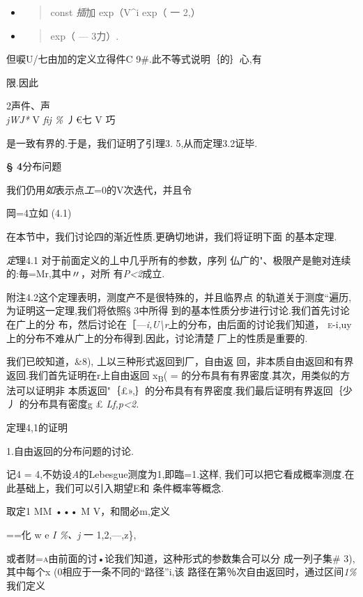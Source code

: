 \documentclass{article}
\begin{document}
\begin{itemize}
\item
  \begin{quote}
  const \emph{插}加 \textbar{}exp（V\^{}i exp（ 一 2,）
  \end{quote}
\item
  \begin{quote}
  exp（ --- 3力）.
  \end{quote}
\end{itemize}

但唳U/七由加的定义立得件C 9\#.此不等式说明｛的｝心,有

限.因此

2声件、声\\
\emph{jWJ*} V \emph{fij \%} 丿€七 V 巧

是一致有界的.于是，我们证明了引理3. 5,从而定理3.2证毕.\textbar{}

\protect\hypertarget{bookmark395}{}{}\textbf{§ 4}分布问题

我们仍用\emph{如}表示点\emph{工}=0的V次迭代，并且令

岡=4立如 (4.1)

在本节中，我们讨论四的渐近性质.更确切地讲，我们将证明下面 的基本定理.

\emph{定}理4.1 对于前面定义的丄中几乎所有的参数，序列
仏广的"、极限产是鲍对连续的:毎=Mr,其中〃，对所
有\emph{P\textless{}2}成立.

附注4.2这个定理表明，测度产不是很特殊的，并且临界点
的轨道关于测度``遍历,为证明这一定理,我们将依照§ 3中所得
到的基本性质分步进行讨论.我们首先讨论在广上的分
布，然后讨论在［---\emph{i,U\textbackslash{}r}上的分布，由后面的讨论我们知道，
\textsc{e-}i,uy 上的分布不难从广上的分布得到.因此，讨论清楚
厂上的性质是重要的.

我们已皎知道，\&8), 丄以三种形式返回到厂，自由返
回，非本质自由返回和有界返回.我们首先证明在r上自由返回
x\textsubscript{B}( = 的分布具有有界密度.其次，用类似的方法可以证明非
本质返回"｛£»,｝的分布具有有界密度.我们最后证明有界返回｛少丿
的分布具有密度g £ \emph{Lf,p\textless{}2.}

定理4,1的证明

1.自由返回的分布问题的讨论.

记4 = 4,不妨设\emph{A}的Lebesgue测度为1,即臨=1.这样,
我们可以把它看成概率测度.在此基础上，我们可以引入期望E和 条件概率等概念.

取定1 MM ••• M V，和間必m,定义

==化 w e \emph{I \%、j} 一 1,2,---,z\},

或者财=\textsc{a}由前面的讨•论我们知道，这种形式的参数集合可以分
成一列子集\# 3),其中每个x (0相应于一条不同的``路径''i,该
路径在第％次自由返回时，通过区间\emph{1\%}我们定义
\end{document}
